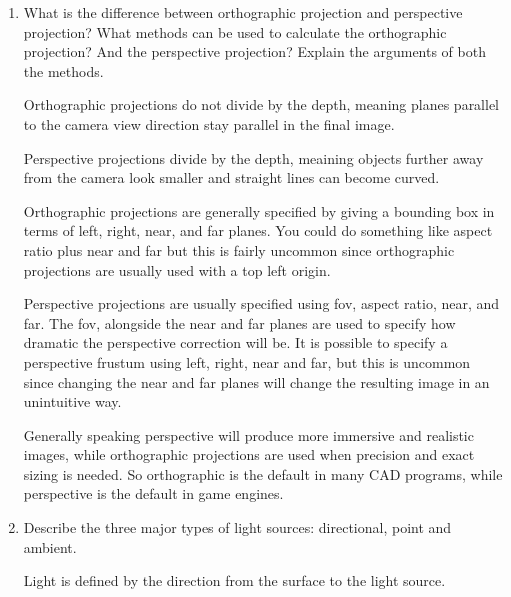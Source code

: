 \documentclass{article}
\begin{document}
\begin{enumerate}
            \break
        \item What is the difference between orthographic projection and perspective projection? What methods
            can be used to calculate the orthographic projection? And the perspective projection? Explain
            the arguments of both the methods.

            \begin{mdframed}
                Orthographic projections do not divide by the
                depth, meaning planes parallel to the
                camera view direction stay parallel in
                the final image.

                Perspective projections divide by the depth,
                meaining objects further away from the camera
                look smaller and straight lines can
                become curved.

                Orthographic projections are generally specified
                by giving a bounding box in terms of left,
                right, near, and far planes. You could
                do something like aspect ratio plus near
                and far but this is fairly uncommon since
                orthographic projections are usually used with
                a top left origin.

                Perspective projections are usually specified
                using fov, aspect ratio, near, and far.
                The fov, alongside the near and far planes
                are used to specify how dramatic the perspective
                correction will be. It is possible to specify
                a perspective frustum using left, right,
                near and far, but this is uncommon since
                changing the near and far planes will change
                the resulting image in an unintuitive way.

                Generally speaking perspective will produce
                more immersive and realistic images, while orthographic
                projections are used when precision and exact sizing is
                needed. So orthographic is the default in many CAD programs,
                while perspective is the default in game engines.
            \end{mdframed}

        \item Describe the three major types of light sources: directional, point and ambient.

            \begin{mdframed}
                Light is defined by the direction from the surface
                to the light source.


\end{mdframed}
\end{enumerate}
\end{document}
